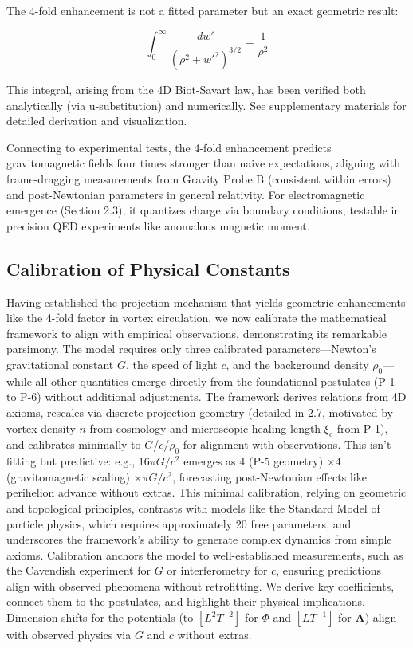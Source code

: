 The 4-fold enhancement is not a fitted parameter but an exact geometric result:

\[
\int_0^\infty \frac{dw'}{(\rho^2 + w'^2)^{3/2}} = \frac{1}{\rho^2}
\]

This integral, arising from the 4D Biot-Savart law, has been verified both analytically (via u-substitution) and numerically. See supplementary materials for detailed derivation and visualization.

Connecting to experimental tests, the 4-fold enhancement predicts gravitomagnetic fields four times stronger than naive expectations, aligning with frame-dragging measurements from Gravity Probe B (consistent within errors) and post-Newtonian parameters in general relativity. For electromagnetic emergence (Section 2.3), it quantizes charge via boundary conditions, testable in precision QED experiments like anomalous magnetic moment.

\subsection{Calibration of Physical Constants}

Having established the projection mechanism that yields geometric enhancements like the 4-fold factor in vortex circulation, we now calibrate the mathematical framework to align with empirical observations, demonstrating its remarkable parsimony. The model requires only three calibrated parameters---Newton's gravitational constant $G$, the speed of light $c$, and the background density $\rho_0$---while all other quantities emerge directly from the foundational postulates (P-1 to P-6) without additional adjustments. The framework derives relations from 4D axioms, rescales via discrete projection geometry (detailed in 2.7, motivated by vortex density $\bar{n}$ from cosmology and microscopic healing length $\xi_c$ from P-1), and calibrates minimally to $G$/$c$/$\rho_0$ for alignment with observations. This isn't fitting but predictive: e.g., $16\pi G/c^2$ emerges as $4$ (P-5 geometry) $\times 4$ (gravitomagnetic scaling) $\times \pi G/c^2$, forecasting post-Newtonian effects like perihelion advance without extras. This minimal calibration, relying on geometric and topological principles, contrasts with models like the Standard Model of particle physics, which requires approximately 20 free parameters, and underscores the framework's ability to generate complex dynamics from simple axioms. Calibration anchors the model to well-established measurements, such as the Cavendish experiment for $G$ or interferometry for $c$, ensuring predictions align with observed phenomena without retrofitting. We derive key coefficients, connect them to the postulates, and highlight their physical implications. Dimension shifts for the potentials (to $[L^2 T^{-2}]$ for $\Phi$ and $[L T^{-1}]$ for $\mathbf{A}$) align with observed physics via $G$ and $c$ without extras.

